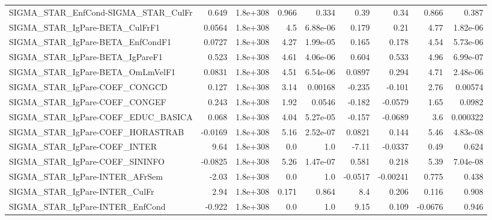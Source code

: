 \begin{tabular}{lrrrrrrrr}
SIGMA\_STAR\_EnfCond-SIGMA\_STAR\_CulFr   &       0.649 &     1.8e+308 &    0.966 &    0.334 &       0.39 &        0.34 &        0.866 &         0.387 \\
SIGMA\_STAR\_IgPare-BETA\_CulFrF1        &      0.0564 &     1.8e+308 &      4.5 & 6.88e-06 &      0.179 &        0.21 &         4.77 &      1.82e-06 \\
SIGMA\_STAR\_IgPare-BETA\_EnfCondF1      &      0.0727 &     1.8e+308 &     4.27 & 1.99e-05 &      0.165 &       0.178 &         4.54 &      5.73e-06 \\
SIGMA\_STAR\_IgPare-BETA\_IgPareF1       &       0.523 &     1.8e+308 &     4.61 & 4.06e-06 &      0.604 &       0.533 &         4.96 &      6.99e-07 \\
SIGMA\_STAR\_IgPare-BETA\_OmLmVelF1      &      0.0831 &     1.8e+308 &     4.51 & 6.54e-06 &     0.0897 &       0.294 &         4.71 &      2.48e-06 \\
SIGMA\_STAR\_IgPare-COEF\_CONGCD         &       0.127 &     1.8e+308 &     3.14 &  0.00168 &     -0.235 &      -0.101 &         2.76 &       0.00574 \\
SIGMA\_STAR\_IgPare-COEF\_CONGEF         &       0.243 &     1.8e+308 &     1.92 &   0.0546 &     -0.182 &     -0.0579 &         1.65 &        0.0982 \\
SIGMA\_STAR\_IgPare-COEF\_EDUC\_BASICA    &       0.068 &     1.8e+308 &     4.04 & 5.27e-05 &     -0.157 &     -0.0689 &          3.6 &      0.000322 \\
SIGMA\_STAR\_IgPare-COEF\_HORASTRAB      &     -0.0169 &     1.8e+308 &     5.16 & 2.52e-07 &     0.0821 &       0.144 &         5.46 &      4.83e-08 \\
SIGMA\_STAR\_IgPare-COEF\_INTER          &        9.64 &     1.8e+308 &      0.0 &      1.0 &      -7.11 &     -0.0337 &         0.49 &         0.624 \\
SIGMA\_STAR\_IgPare-COEF\_SININFO        &     -0.0825 &     1.8e+308 &     5.26 & 1.47e-07 &      0.581 &       0.218 &         5.39 &      7.04e-08 \\
SIGMA\_STAR\_IgPare-INTER\_AFrSem        &       -2.03 &     1.8e+308 &      0.0 &      1.0 &    -0.0517 &    -0.00241 &        0.775 &         0.438 \\
SIGMA\_STAR\_IgPare-INTER\_CulFr         &        2.94 &     1.8e+308 &    0.171 &    0.864 &        8.4 &       0.206 &        0.116 &         0.908 \\
SIGMA\_STAR\_IgPare-INTER\_EnfCond       &      -0.922 &     1.8e+308 &      0.0 &      1.0 &       9.15 &       0.109 &      -0.0676 &         0.946 \\

\end{tabular}

